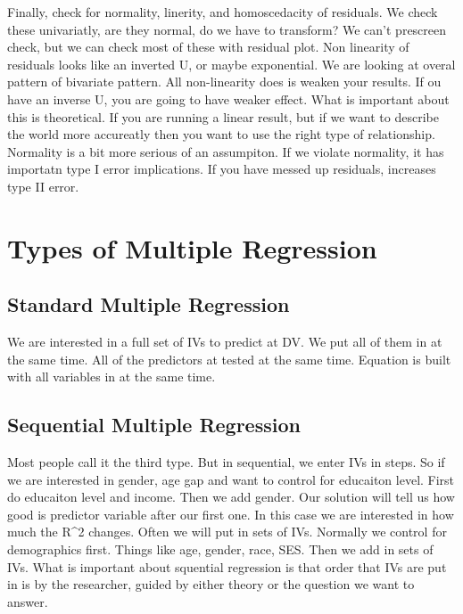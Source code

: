 \documentclass[]{book}
\theoremstyle{definition}
\theoremstyle{definition}
\theoremstyle{definition}
\theoremstyle{remark}
\begin{document}
Finally, check for normality, linerity, and homoscedacity of residuals.
We check these univariatly, are they normal, do we have to transform? We
can't prescreen check, but we can check most of these with residual
plot. Non linearity of residuals looks like an inverted U, or maybe
exponential. We are looking at overal pattern of bivariate pattern. All
non-linearity does is weaken your results. If ou have an inverse U, you
are going to have weaker effect. What is important about this is
theoretical. If you are running a linear result, but if we want to
describe the world more accureatly then you want to use the right type
of relationship. Normality is a bit more serious of an assumpiton. If we
violate normality, it has importatn type I error implications. If you
have messed up residuals, increases type II error.

\section{Types of Multiple
Regression}\label{types-of-multiple-regression}

\subsection{Standard Multiple
Regression}\label{standard-multiple-regression}

We are interested in a full set of IVs to predict at DV. We put all of
them in at the same time. All of the predictors at tested at the same
time. Equation is built with all variables in at the same time.

\subsection{Sequential Multiple
Regression}\label{sequential-multiple-regression}

Most people call it the third type. But in sequential, we enter IVs in
steps. So if we are interested in gender, age gap and want to control
for educaiton level. First do educaiton level and income. Then we add
gender. Our solution will tell us how good is predictor variable after
our first one. In this case we are interested in how much the R\^{}2
changes. Often we will put in sets of IVs. Normally we control for
demographics first. Things like age, gender, race, SES. Then we add in
sets of IVs. What is important about squential regression is that order
that IVs are put in is by the researcher, guided by either theory or the
question we want to answer.
\end{document}
